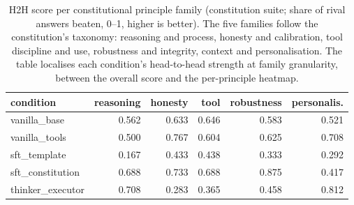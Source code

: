 \begin{table}[t]
  \centering
  \caption{H2H score per constitutional principle family (constitution suite; share of rival answers beaten, 0--1, higher is better). The five families follow the constitution's taxonomy: reasoning and process, honesty and calibration, tool discipline and use, robustness and integrity, context and personalisation. The table localises each condition's head-to-head strength at family granularity, between the overall score and the per-principle heatmap.}
  \label{tab:rank-families}
  \begin{tabular}{lrrrrr}
    \toprule
    condition & reasoning & honesty & tool & robustness & personalis. \\
    \midrule
    vanilla\_base & 0.562 & 0.633 & 0.646 & 0.583 & 0.521 \\
    vanilla\_tools & 0.500 & 0.767 & 0.604 & 0.625 & 0.708 \\
    sft\_template & 0.167 & 0.433 & 0.438 & 0.333 & 0.292 \\
    sft\_constitution & 0.688 & 0.733 & 0.688 & 0.875 & 0.417 \\
    thinker\_executor & 0.708 & 0.283 & 0.365 & 0.458 & 0.812 \\
    \bottomrule
  \end{tabular}
\end{table}

